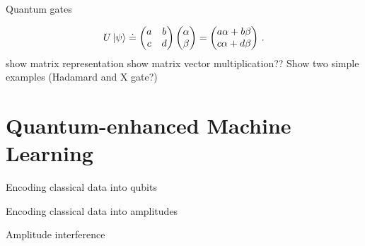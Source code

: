 \documentclass[10pt]{beamer}
\begin{document}
{
\begin{frame}[fragile]{Quantum gates}

\begin{equation}
\label{equ:unitarytransformation}
U \ket{\psi} \doteq \begin{pmatrix}
 a & b \\ 
 c & d
 \end{pmatrix} \begin{pmatrix} \alpha\\ \beta \end{pmatrix}= \begin{pmatrix} a\alpha+b\beta\\c\alpha+d\beta\end{pmatrix}\, .
\end{equation}
show matrix representation
show matrix vector multiplication??
Show two simple examples (Hadamard and X gate?)

\end{frame}
}


\section{Quantum-enhanced Machine Learning}

{
\begin{frame}[fragile]{Encoding classical data into qubits}



\end{frame}
}

{
\begin{frame}[fragile]{Encoding classical data into amplitudes}


\end{frame}
}

{
\begin{frame}[fragile]{Amplitude interference}


\end{frame}
}
\end{document}
